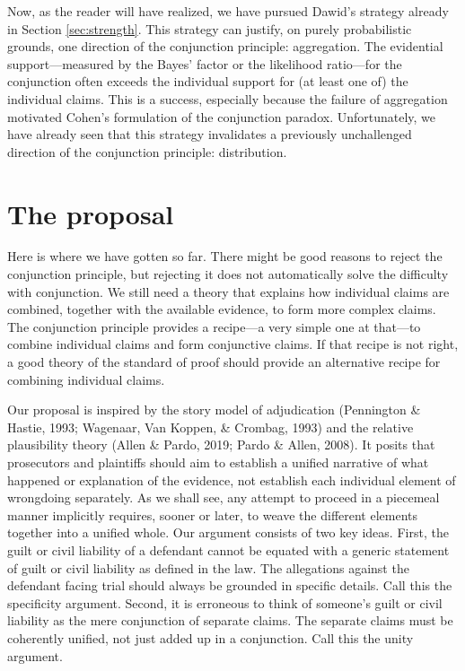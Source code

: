 \documentclass[
  10pt,
  dvipsnames,enabledeprecatedfontcommands]{scrartcl}
\begin{document}
Now, as the reader will have realized, we have pursued Dawid's strategy
already in Section \ref{sec:strength}. This strategy can justify, on
purely probabilistic grounds, one direction of the conjunction
principle: aggregation. The evidential support---measured by the Bayes'
factor or the likelihood ratio---for the conjunction often exceeds the
individual support for (at least one of) the individual claims. This is
a success, especially because the failure of aggregation motivated
Cohen's formulation of the conjunction paradox. Unfortunately, we have
already seen that this strategy invalidates a previously unchallenged
direction of the conjunction principle: distribution.

\hypertarget{the-proposal}{%
\section{The proposal}\label{the-proposal}}

\label{sec:proposal}

Here is where we have gotten so far. There might be good reasons to
reject the conjunction principle, but rejecting it does not
automatically solve the difficulty with conjunction. We still need a
theory that explains how individual claims are combined, together with
the available evidence, to form more complex claims. The conjunction
principle provides a recipe---a very simple one at that---to combine
individual claims and form conjunctive claims. If that recipe is not
right, a good theory of the standard of proof should provide an
alternative recipe for combining individual claims.

Our proposal is inspired by the story model of adjudication (Pennington
\& Hastie, 1993; Wagenaar, Van Koppen, \& Crombag, 1993) and the
relative plausibility theory (Allen \& Pardo, 2019; Pardo \& Allen,
2008). It posits that prosecutors and plaintiffs should aim to establish
a unified narrative of what happened or explanation of the evidence, not
establish each individual element of wrongdoing separately. As we shall
see, any attempt to proceed in a piecemeal manner implicitly requires,
sooner or later, to weave the different elements together into a unified
whole. Our argument consists of two key ideas. First, the guilt or civil
liability of a defendant cannot be equated with a generic statement of
guilt or civil liability as defined in the law. The allegations against
the defendant facing trial should always be grounded in specific
details. Call this the specificity argument. Second, it is erroneous to
think of someone's guilt or civil liability as the mere conjunction of
separate claims. The separate claims must be coherently unified, not
just added up in a conjunction. Call this the unity argument.
\end{document}

